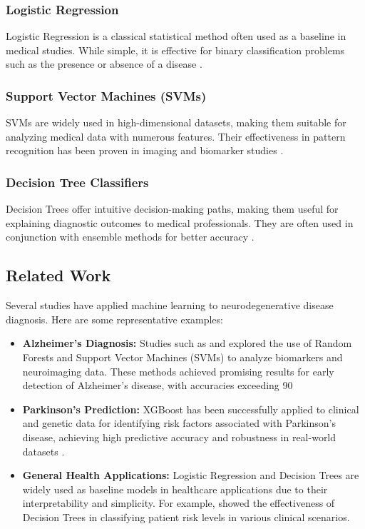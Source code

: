 \documentclass[conference]{IEEEtran}
\begin{document}
\subsubsection{Logistic Regression}
Logistic Regression is a classical statistical method often used as a baseline in medical studies. While simple, it is effective for binary classification problems such as the presence or absence of a disease \cite{b7}.

\subsubsection{Support Vector Machines (SVMs)}
SVMs are widely used in high-dimensional datasets, making them suitable for analyzing medical data with numerous features. Their effectiveness in pattern recognition has been proven in imaging and biomarker studies \cite{b3}.

\subsubsection{Decision Tree Classifiers}
Decision Trees offer intuitive decision-making paths, making them useful for explaining diagnostic outcomes to medical professionals. They are often used in conjunction with ensemble methods for better accuracy \cite{b7}.

\subsection{Related Work}
Several studies have applied machine learning to neurodegenerative disease diagnosis. Here are some representative examples:
\begin{itemize}
    \item \textbf{Alzheimer’s Diagnosis:} Studies such as \cite{b4} and \cite{b5} explored the use of Random Forests and Support Vector Machines (SVMs) to analyze biomarkers and neuroimaging data. These methods achieved promising results for early detection of Alzheimer’s disease, with accuracies exceeding 90%
    \item \textbf{Parkinson’s Prediction:} XGBoost has been successfully applied to clinical and genetic data for identifying risk factors associated with Parkinson’s disease, achieving high predictive accuracy and robustness in real-world datasets \cite{b6}.
    \item \textbf{General Health Applications:} Logistic Regression and Decision Trees are widely used as baseline models in healthcare applications due to their interpretability and simplicity. For example, \cite{b7} showed the effectiveness of Decision Trees in classifying patient risk levels in various clinical scenarios.
\end{itemize}
\end{document}
